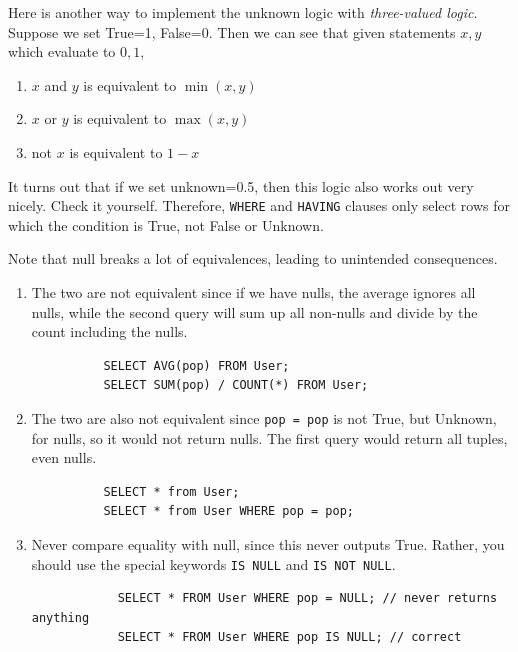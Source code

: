 \documentclass{article}
\begin{document}
    \begin{theorem}
      Here is another way to implement the unknown logic with \textit{three-valued logic}. Suppose we set True=1, False=0. Then we can see that given statements $x, y$ which evaluate to $0, 1$, 
      \begin{enumerate}
        \item $x$ and $y$ is equivalent to $\min(x, y)$
        \item $x$ or $y$ is equivalent to $\max(x, y)$ 
        \item not $x$ is equivalent to $1 - x$
      \end{enumerate}
      It turns out that if we set unknown=0.5, then this logic also works out very nicely. Check it yourself. Therefore, \texttt{WHERE} and \texttt{HAVING} clauses only select rows for which the condition is True, not False or Unknown. 
    \end{theorem}

    \begin{example}[Warnings]
      Note that null breaks a lot of equivalences, leading to unintended consequences. 
      \begin{enumerate}
        \item The two are not equivalent since if we have nulls, the average ignores all nulls, while the second query will sum up all non-nulls and divide by the count including the nulls. 
        \begin{lstlisting}
          SELECT AVG(pop) FROM User; 
          SELECT SUM(pop) / COUNT(*) FROM User; 
        \end{lstlisting}

        \item The two are also not equivalent since \texttt{pop = pop} is not True, but Unknown, for nulls, so it would not return nulls. The first query would return all tuples, even nulls. 
        \begin{lstlisting}
          SELECT * from User; 
          SELECT * from User WHERE pop = pop; 
        \end{lstlisting}

        \item Never compare equality with null, since this never outputs True. Rather, you should use the special keywords \texttt{IS NULL} and \texttt{IS NOT NULL}. 
          \begin{lstlisting}
            SELECT * FROM User WHERE pop = NULL; // never returns anything 
            SELECT * FROM User WHERE pop IS NULL; // correct 
          \end{lstlisting}
      \end{enumerate}
    \end{example}
\end{document}
